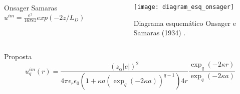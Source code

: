 \documentclass{beamer}
\begin{document}
\begin{frame}
	\begin{columns}
		\begin{column}{3.5cm}
	\begin{block}{Onsager Samaras}
	$	u^{im} = \frac{e^2}{16\pi \epsilon z } exp(-2z/L_D )$
	\end{block}
		\end{column}
		\begin{column}{6.0cm}
	\begin{figure}
 \centering
  \texttt{[image: diagram\_esq\_onsager]}
		\caption{Diagrama esquemático Onsager e Samaras (1934) .}
	\end{figure}

		\end{column}
	\end{columns}
        \begin{block}{Proposta} 
	\begin{equation}
		u^{im}_q(r) = \frac{(z_{\alpha}|e|)^2}{4\pi \epsilon_r \epsilon_0 (1+\kappa a( \exp_q(-2\kappa a))^{q-1})4r}\frac{\exp_q(-2\kappa r)}{\exp_q(-2\kappa a)} 
        \end{equation}
	\end{block}

\end{frame}
\end{document}
